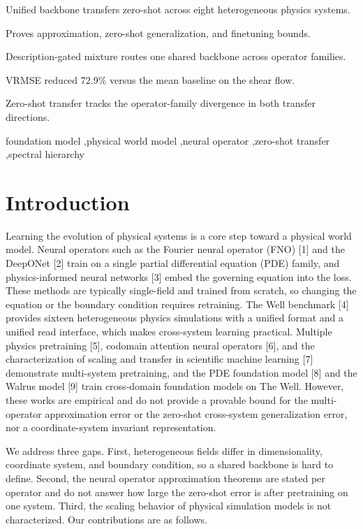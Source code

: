 \documentclass[preprint,12pt]{elsarticle}
\begin{document}
\begin{frontmatter}
\begin{highlights}
\item Unified backbone transfers zero-shot across eight heterogeneous physics systems.
\item Proves approximation, zero-shot generalization, and finetuning bounds.
\item Description-gated mixture routes one shared backbone across operator families.
\item VRMSE reduced 72.9\% versus the mean baseline on the shear flow.
\item Zero-shot transfer tracks the operator-family divergence in both transfer directions.
\end{highlights}

\begin{keyword}
foundation model \sep physical world model \sep neural operator \sep zero-shot transfer \sep spectral hierarchy
\end{keyword}

\end{frontmatter}

\section{Introduction}
Learning the evolution of physical systems is a core step toward a physical world model. Neural operators such as the Fourier neural operator (FNO) [1] and the DeepONet [2] train on a single partial differential equation (PDE) family, and physics-informed neural networks [3] embed the governing equation into the loss. These methods are typically single-field and trained from scratch, so changing the equation or the boundary condition requires retraining. The Well benchmark [4] provides sixteen heterogeneous physics simulations with a unified format and a unified read interface, which makes cross-system learning practical. Multiple physics pretraining [5], codomain attention neural operators [6], and the characterization of scaling and transfer in scientific machine learning [7] demonstrate multi-system pretraining, and the PDE foundation model [8] and the Walrus model [9] train cross-domain foundation models on The Well. However, these works are empirical and do not provide a provable bound for the multi-operator approximation error or the zero-shot cross-system generalization error, nor a coordinate-system invariant representation.

We address three gaps. First, heterogeneous fields differ in dimensionality, coordinate system, and boundary condition, so a shared backbone is hard to define. Second, the neural operator approximation theorems are stated per operator and do not answer how large the zero-shot error is after pretraining on one system. Third, the scaling behavior of physical simulation models is not characterized. Our contributions are as follows.
\end{document}
